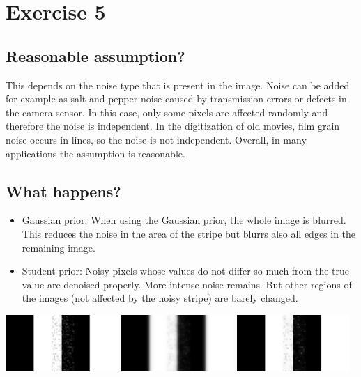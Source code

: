 \documentclass[a4paper,11pt, final]{scrartcl}
\begin{document}
\section*{Exercise 5}
\subsection*{Reasonable assumption?}
This depends on the noise type that is present in the image. Noise can be added for example as salt-and-pepper noise caused by transmission errors or defects in the camera sensor. In this case, only some pixels are affected randomly and therefore the noise is independent.
In the digitization of old movies, film grain noise occurs in lines, so the noise is not independent.
Overall, in many applications the assumption is reasonable.

\subsection*{What happens?}
\begin{itemize}
\item Gaussian prior: When using the Gaussian prior, the whole image is blurred. This reduces the noise in the area of the stripe but blurrs also all edges in the remaining image.
\item Student prior: Noisy pixels whose values do not differ so much from the true value are denoised properly. More intense noise remains. But other regions of the images (not affected by the noisy stripe) are barely changed.  
\end{itemize}

{
\centering 
\includegraphics[width=0.32\textwidth]{ex5_stripes_noise.png}
\includegraphics[width=0.32\textwidth]{ex5_stripes_mrf_gaussian_filtered.png}
\includegraphics[width=0.32\textwidth]{ex5_stripes_mrf_student_filtered.png}
}
\end{document}
